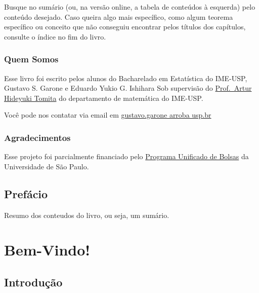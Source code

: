 \documentclass[
  letterpaper,
  DIV=11,
  numbers=noendperiod]{scrreprt}
\begin{document}
Busque no sumário (ou, na versão online, a tabela de conteúdos à
esquerda) pelo conteúdo desejado. Caso queira algo mais específico, como
algum teorema específico ou conceito que não conseguiu encontrar pelos
títulos dos capítulos, consulte o índice no fim do livro.

\section*{Quem Somos}\label{quem-somos}


Esse livro foi escrito pelos alunos do Bacharelado em Estatística do
IME-USP, Gustavo S. Garone e Eduardo Yukio G. Ishihara Sob supervisão do
\href{https://www.ime.usp.br/~tomita/}{Prof.~Artur Hideyuki Tomita} do
departamento de matemática do IME-USP.

Você pode nos contatar via email em
\href{mailto:gustavo.garone@usp.br}{gustavo.garone arroba usp.br}

\section*{Agradecimentos}\label{agradecimentos}


Esse projeto foi parcialmente financiado pelo
\href{https://prip.usp.br/pub/}{Programa Unificado de Bolsas} da
Universidade de São Paulo.


\chapter*{Prefácio}\label{prefuxe1cio}


Resumo dos conteudos do livro, ou seja, um sumário.

\part{Bem-Vindo!}

\chapter{Introdução}\label{introduuxe7uxe3o}
\end{document}

